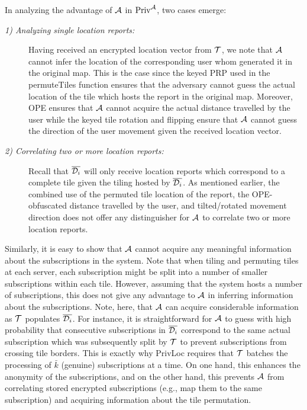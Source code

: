 \documentclass{llncs}
\newcommand\sol{{\sf PrivLoc}}
\begin{document}
In analyzing the advantage of $\cal A$ in $\mathrm{Priv}^{\cal A}$, two cases emerge:
\begin{description}
\item[\emph{1) Analyzing single location reports: }] Having received an encrypted location vector from $\cal T$, we note that $\cal A$ cannot infer the location of the corresponding user whom generated it in the original map. This is the case
since the keyed PRP used in the {\sf permuteTiles} function ensures that the adversary cannot guess the actual location of the tile which hosts the report in the original map. Moreover, OPE ensures that $\cal A$ cannot
acquire the actual distance travelled by the user while the keyed tile rotation and flipping ensure that $\cal A$ cannot guess the direction of the user movement given the received location vector.
\item[\emph{2) Correlating two or more location reports: }] Recall that $\overline{{\cal D}_i}$ will only receive location reports which correspond to a complete tile given the tiling hosted by $\overline{{\cal D}_i}$. As mentioned earlier, the combined use of the permuted tile location of the report, the OPE-obfuscated distance
travelled by the user, and tilted/rotated movement direction does not offer any distinguisher for $\cal A$ to correlate two or more location reports.
\end{description}



Similarly, it is easy to show that $\cal A$ cannot acquire any meaningful information about the subscriptions in the system. Note that when tiling and permuting tiles at each server, each subscription
might be split into a number of smaller subscriptions within each tile. However, assuming that the system hosts a number of subscriptions, this does not give any advantage to $\cal A$ in inferring information about the subscriptions.
Note, here, that $\cal A$ can acquire considerable information as $\cal T$ populates $\overline{{\cal D}_i}$. For instance, it is straightforward for $\cal A$ to guess with high probability that consecutive subscriptions
in $\overline{{\cal D}_i}$
correspond to the same actual subscription which was subsequently split by $\cal T$ to prevent subscriptions from crossing tile borders. This is exactly why \sol{} requires that $\cal T$ batches the processing of $\bar{k}$ (genuine) subscriptions
at a time. On one hand, this enhances the anonymity of the subscriptions, and on the other hand, this prevents $\cal A$ from correlating stored encrypted subscriptions (e.g., map them to the same subscription) and acquiring information about the tile permutation.
\end{document}
